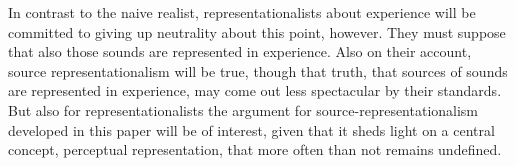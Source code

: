 \documentclass[sloppy, journal, git, bytitle, dodraft]{humapap}
\begin{document}
In contrast to the naive realist, representationalists about experience will be committed to giving up neutrality about this point, however. They must suppose that also those sounds are represented in experience. Also on their account, source representationalism will be true, though that truth, that sources of sounds are represented in experience, may come out less spectacular by their standards. But also for representationalists the argument for source-representationalism developed in this paper will be of interest, given that it sheds light on a central concept, perceptual representation, that more often than not remains undefined. 




% 
% 
% 


\printbibliography
\end{document}
